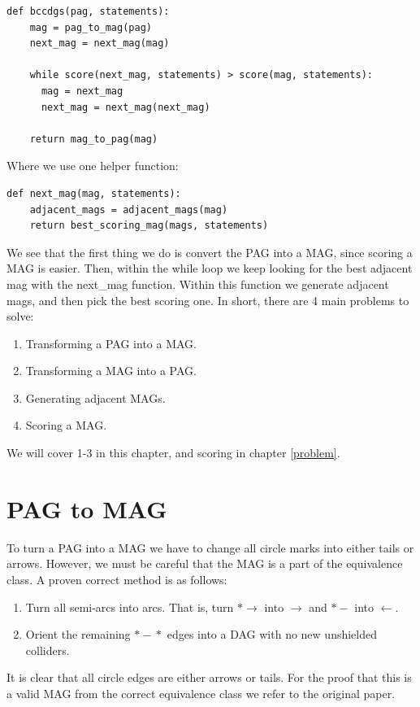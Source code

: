\documentclass[11pt,a4paper]{report}
\begin{document}
\begin{lstlisting}
def bccdgs(pag, statements):
    mag = pag_to_mag(pag)
    next_mag = next_mag(mag)

    while score(next_mag, statements) > score(mag, statements):
      mag = next_mag
      next_mag = next_mag(next_mag)

    return mag_to_pag(mag)
\end{lstlisting}
Where we use one helper function:
\begin{lstlisting}
def next_mag(mag, statements):
    adjacent_mags = adjacent_mags(mag)
    return best_scoring_mag(mags, statements)
\end{lstlisting}
We see that the first thing we do is convert the PAG into a MAG, since
scoring a MAG is easier. Then, within the while loop we keep looking for
the best adjacent mag with the next\_mag function. Within this function we
generate adjacent mags, and then pick the best scoring one. In short,
there are 4 main problems to solve:
\begin{enumerate}
  \item Transforming a PAG into a MAG.

  \item Transforming a MAG into a PAG.

  \item Generating adjacent MAGs.

  \item Scoring a MAG.
\end{enumerate}
We will cover 1-3 in this chapter, and scoring in chapter \ref{problem}.

\section{PAG to MAG}
To turn a PAG into a MAG we have to change all circle marks into either
tails or arrows. However, we must be careful that the MAG is a part of the
equivalence class. A proven correct method is as follows:

\begin{enumerate}
  \item Turn all semi-arcs into arcs. That is, turn
    $*\!\!\!\rightarrow$ into $\rightarrow$ and
    $*\!-$ into $\leftarrow$.

  \item Orient the remaining $*\!\!\!-\!\!\!*$ edges into a DAG with no new unshielded
    colliders.
\end{enumerate}
It is clear that all circle edges are either arrows or tails. For the
proof that this is a valid MAG from the correct equivalence class we refer
to the original paper\cite{zhangCompletenessOrientationRules2008}.
\end{document}
